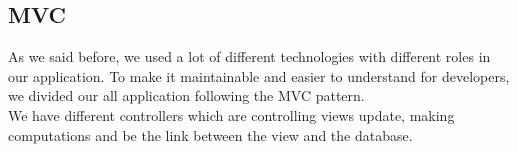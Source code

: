 \documentclass[12pt]{article}
\begin{document}
    {\color{color_subsection}\subsection{MVC}}

    \noindent As we said before, we used a lot of different technologies with different
    roles in our application. To make it maintainable and easier to understand
    for developers, we divided our all application following the MVC pattern.\\

    \noindent We have different controllers which are controlling views update,
    making computations and be the link between the view and the database.\\
\end{document}
